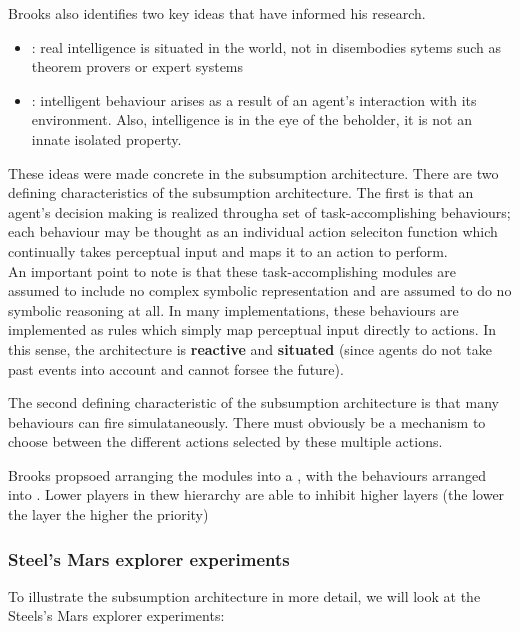 Brooks also identifies two key ideas that have informed his research.
\begin{itemize}
\item {}: real intelligence is situated in the world, not in disembodies sytems such as theorem provers or expert systems
\item {}: intelligent behaviour arises as a result of an agent's interaction with its environment. Also, intelligence is in the eye of the beholder, it is not an innate isolated property.
\end{itemize}

These ideas were made concrete in the subsumption architecture. There are two defining characteristics of the subsumption architecture. The first is that an agent's decision making is realized througha  set of task-accomplishing behaviours; each behaviour may be thought as an individual action seleciton function which continually takes perceptual input and maps it to an action to perform.\\
An important point to note is that these task-accomplishing modules are assumed to include no complex symbolic representation and are assumed to do no symbolic reasoning at all. In many implementations, these behaviours are implemented as rules which simply map perceptual input directly to actions. In this sense, the architecture is \textbf{reactive} and \textbf{situated} (since agents do not take past events into account and cannot forsee the future).

The second defining characteristic of the subsumption architecture is that many behaviours can fire simulataneously. There must obviously be a mechanism to choose between the different actions selected by these multiple actions.

Brooks propsoed arranging the modules into a , with the behaviours arranged into . Lower players in thew hierarchy are able to inhibit higher layers (the lower the layer the higher the priority)
\subsubsection{Steel's Mars explorer experiments}

To illustrate the subsumption architecture in more detail, we will look at the Steels's Mars explorer experiments:


